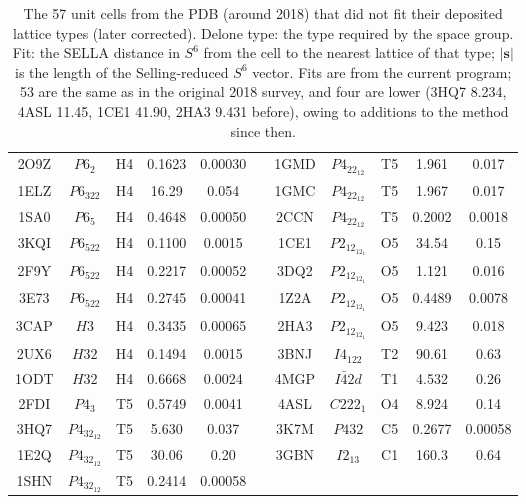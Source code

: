 \documentclass[preprint]{iucr}              %
\begin{document}
\begin{table}
\begin{tabular}{ccccc@{\hspace{18pt}}c@{\hspace{18pt}}ccccc}
			2O9Z&$P6_2$&H4&0.1623&0.00030 && 1GMD&$P4_22_12$&T5&1.961&0.017\\
			1ELZ&$P6_322$&H4&16.29&0.054 && 1GMC&$P4_22_12$&T5&1.967&0.017\\
			1SA0&$P6_5$&H4&0.4648&0.00050 && 2CCN&$P4_22_12$&T5&0.2002&0.0018\\
			3KQI&$P6_522$&H4&0.1100&0.0015 && 1CE1&$P2_12_12_1$&O5&34.54&0.15\\
			2F9Y&$P6_522$&H4&0.2217&0.00052 && 3DQ2&$P2_12_12_1$&O5&1.121&0.016\\
			3E73&$P6_522$&H4&0.2745&0.00041 && 1Z2A&$P2_12_12_1$&O5&0.4489&0.0078\\
			3CAP&$H3$&H4&0.3435&0.00065 && 2HA3&$P2_12_12_1$&O5&9.423&0.018\\
			2UX6&$H32$&H4&0.1494&0.0015 && 3BNJ&$I4_122$&T2&90.61&0.63\\
			1ODT&$H32$&H4&0.6668&0.0024 && 4MGP&$I\bar{4}2d$&T1&4.532&0.26\\
			2FDI&$P4_3$&T5&0.5749&0.0041 && 4ASL&$C222_1$&O4&8.924&0.14\\
			3HQ7&$P4_32_12$&T5&5.630&0.037 && 3K7M&$P432$&C5&0.2677&0.00058\\
			1E2Q&$P4_32_12$&T5&30.06&0.20 && 3GBN&$I2_13$&C1&160.3&0.64\\
			1SHN&$P4_32_12$&T5&0.2414&0.00058 && &&&&\\
			\bottomrule
		\end{tabular}
		
		\caption{The 57 unit cells from the PDB (around 2018) that did not fit
			their deposited lattice types (later corrected). Delone type: the
			type required by the space group. Fit: the SELLA distance in $S^6$
			from the cell to the nearest lattice of that type; $|\mathbf{s}|$ is
			the length of the Selling-reduced $S^6$ vector. Fits are from the current program;
			53 are the same as in the original 2018 survey, and four are lower
			(3HQ7 8.234, 4ASL 11.45, 1CE1 41.90, 2HA3 9.431 before), owing to
			additions to the method since then.}
		\label{tab:PDBCells}
	\end{table}
	
	
	
	
	
	
\end{document}

